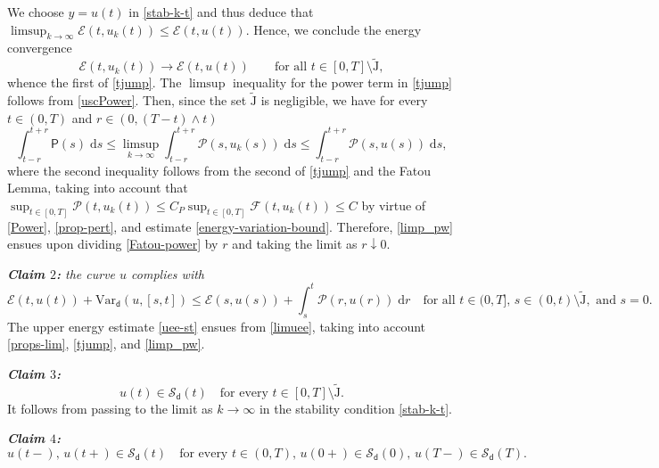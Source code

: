\documentclass[a4paper,10pt,reqno]{amsart} %
\numberwithin{equation}{section}
\newcommand{\down}{\downarrow}
\def\dd{\;\!\mathrm{d}} %
\newcommand{\mdn}{\mathsf{d}}
\newcommand{\ene}[2]{\mathcal{E}(#1,#2)}
\newcommand{\pert}[2]{\mathcal{F}(#1,#2)}
\newcommand{\pw}[2]{\mathcal{P}(#1,#2)}
\newcommand{\Vari}[4]{\mathrm{Var}_{#1}(#2,[#3,#4])}
\newcommand{\lli}[2]{{#1}({#2}{-})}
\newcommand{\rli}[2]{{#1}({#2}{+})}
\newcommand{\tjump}{\widetilde{\mathrm{J}}}
\newcommand{\stabi}[2]{\mathscr{S}_{#1}(#2)}
\newcommand{\rstab}[2]{\mathcal{R}(#1,#2)}
\newcommand{\limP}{\mathsf{P}}
\begin{document}
 We choose $y = u(t)$ in \eqref{stab-k-t} and thus deduce that 
$\limsup_{k\to\infty} \ene t{u_{k}(t)} \leq \ene t{u(t)}$. 
   Hence,
 we conclude the energy convergence  
\begin{equation}
\label{en-conv}
 \ene t{u_{k}(t)}\to \ene t{u(t)} \qquad \text{for all } t \in [0,T]\setminus \tjump,
\end{equation}
whence the first of \eqref{tjump}. The $\limsup$ inequality for the power term in \eqref{tjump}   follows from \eqref{uscPower}. 
Then, since  the set $\tjump$ is negligible, we have  for every $t\in (0,T) $ and  $r\in (0,(T{-}t)\wedge t)$
\begin{equation}
\label{Fatou-power}
\int_{t-r}^{t+r} \limP(s) \dd s \leq \limsup_{k\to\infty}  \int_{t-r}^{t+r}  \pw s{u_{k}(s)} \dd s \leq  \int_{t-r}^{t+r}   \pw s{u(s)} \dd s,
\end{equation}
where the second inequality follows from the second of \eqref{tjump} and  the Fatou Lemma, taking into account
that $\sup_{t\in[0,T]}    \pw t{u_{k}(t)}  \leq C_P \sup_{t\in[0,T]}    \pert t{u_{k}(t)}  \leq C$ by virtue of \eqref{Power}, \eqref{prop-pert}, and estimate \eqref{energy-variation-bound}. 
Therefore, \eqref{limp_pw} ensues upon dividing  \eqref{Fatou-power}  by $r$ and  taking the limit as $r\down 0$. 
\par
\emph{\textbf{Claim $2$:} the curve $u$ complies with}
\begin{equation}
\label{uee-st}
\ene t{u(t)} + \Vari {\mdn}{u}s{t} \leq \ene s{u(s)} +\int_s^t \pw r{u(r)} \dd r \quad \text{for all } t \in (0,T],  \,  s\in (0,t)\setminus \tjump, \text{ and  } s=0.
\end{equation}
The upper energy estimate \eqref{uee-st} ensues from \eqref{limuee}, taking into account \eqref{props-lim}, \eqref{tjump}, and \eqref{limp_pw}.
\par
\emph{\textbf{Claim $3$:}}
\begin{equation}
\label{stab-outside-tjump}
u(t)\in \stabi{\mdn}t \quad \text{for every $t\in [0,T]\setminus \tjump$.} 
\end{equation}
It follows from passing to the limit as $k\to\infty$ in the stability condition \eqref{stab-k-t}.
\par
\emph{\textbf{Claim $4$:}}
\begin{equation}
\label{stab-at-lr-lim}
 \lli ut, \, \rli u t \in \stabi{\mdn}t \quad \text{for every $t\in (0,T)$,\  \  $\rli u0 \in \stabi {\mdn}0$, \ \ $\lli u T \in \stabi \mdn T$.} 
 \end{equation}
\end{document}
